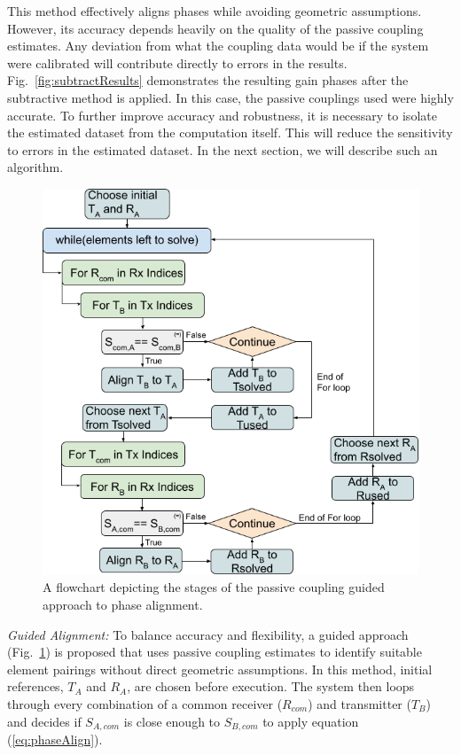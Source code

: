 \documentclass[journal]{IEEEtran}
\begin{document}
This method effectively aligns phases while avoiding geometric assumptions. However, its accuracy depends heavily on the quality of the passive coupling estimates. Any deviation from what the coupling data would be if the system were calibrated will contribute directly to errors in the results. Fig.~\ref{fig:subtractResults} demonstrates the resulting gain phases after the subtractive method is applied. In this case, the passive couplings used were highly accurate. To further improve accuracy and robustness, it is necessary to isolate the estimated dataset from the computation itself. This will reduce the sensitivity to errors in the estimated dataset. In the next section, we will describe such an algorithm. 

\begin{figure}
    \centering
    \includegraphics[width=0.95\linewidth]{Agnostic Alignment.png}
    \caption{A flowchart depicting the stages of the passive coupling guided approach to phase alignment.}
    \label{fig:agnosticPA}
\end{figure}

\noindent
{\em Guided Alignment:}
To balance accuracy and flexibility, a guided approach (Fig.~\ref{fig:agnosticPA}) is proposed that uses passive coupling estimates to identify suitable element pairings without direct geometric assumptions. In this method, initial references, $T_A$ and $R_A$, are chosen before execution. The system then loops through every combination of a common receiver ($R_{com}$) and transmitter ($T_B$) and decides if $S_{A,com}$ is close enough to $S_{B,com}$ to apply equation (\ref{eq:phaseAlign}).
\end{document}
